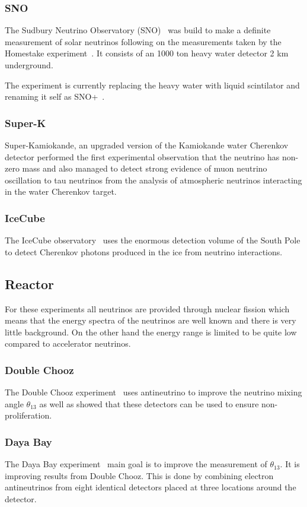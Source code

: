 \subsubsection{SNO}
The Sudbury Neutrino Observatory (SNO)~\cite{Fix6} was build to make a definite measurement of solar neutrinos following on the measurements taken by the Homestake experiment~\cite{9Davis}. It consists of an 1000 ton heavy water detector 2 km underground. 

The experiment is currently replacing the heavy water with liquid scintilator and renaming it self as SNO+~\cite{42SNO+}.
\subsubsection{Super-K}
Super-Kamiokande\cite{20SUPERK}, an upgraded version of the Kamiokande water Cherenkov detector performed the first experimental observation that the neutrino has non-zero mass\cite{10Fukuda} and also managed to detect strong evidence of muon neutrino oscillation to tau neutrinos from the analysis of atmospheric neutrinos interacting in the water Cherenkov target.
\subsubsection{IceCube}
The IceCube observatory~\cite{43IceCube} uses the enormous detection volume of the South Pole to detect Cherenkov photons produced in the ice from neutrino interactions.
\subsection{Reactor}
For these experiments all neutrinos are provided through nuclear fission which means that the energy spectra of the neutrinos are well known and there is very little background. On the other hand the energy range is limited to be quite low compared to accelerator neutrinos.

\subsubsection{Double Chooz}
The Double Chooz experiment~\cite{45DoubleChooz} uses antineutrino to improve the neutrino mixing angle $\theta_{13}$ as well as showed that these detectors can be used to ensure non-proliferation.

\subsubsection{Daya Bay}
The Daya Bay experiment~ \cite{44DayaBay} main goal is to improve the measurement of $\theta_{13}$. It is improving results from Double Chooz. This is done by combining electron antineutrinos from eight identical detectors placed at three locations around the detector.


